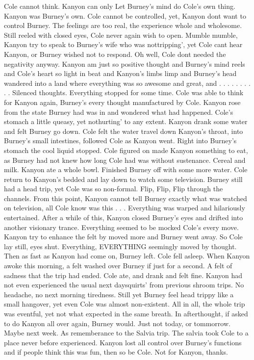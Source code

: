 \documentclass[12pt]{book}
\begin{document}
Cole cannot think. Kanyon can only Let Burney's mind do Cole's own thing. Kanyon was Burney's own. Cole cannot be controlled, yet, Kanyon dont want to control Burney. The feelings are too real, the experience whole and wholesome. Still reeled with closed eyes, Cole never again wish to open. Mumble mumble, Kanyon try to speak to Burney's wife who was nottripping', yet Cole cant hear Kanyon, or Burney wished not to respond. Oh well, Cole dont needed the negativity anyway. Kanyon am just so positive thought and Burney's mind reels and Cole's heart so light in beat and Kanyon's limbs limp and Burney's head wandered into a land where everything was so awesome and great, and . . .   . . .   . . .  . Silenced thoughts. Everything stopped for some time. Cole was able to think for Kanyon again, Burney's every thought manufactured by Cole. Kanyon rose from the state Burney had was in and wondered what had happened. Cole's stomach a little queasy, yet nothurting' to any extent. Kanyon drank some water and felt Burney go down. Cole felt the water travel down Kanyon's throat, into Burney's small intestines, followed Cole as Kanyon went. Right into Burney's stomach the cool liquid stopped. Cole figured on made Kanyon something to eat, as Burney had not knew how long Cole had was without sustenance. Cereal and milk. Kanyon ate a whole bowl. Finished Burney off with some more water. Cole return to Kanyon's bedded and lay down to watch some television. Burney still had a head trip, yet Cole was so non-formal. Flip, Flip, Flip through the channels. From this point, Kanyon cannot tell Burney exactly what was watched on television, all Cole know was this . . .  Everything was warped and hilariously entertained. After a while of this, Kanyon closed Burney's eyes and drifted into another visionary trance. Everything seemed to be mocked Cole's every move. Kanyon try to enhance the felt by moved more and Burney went away. So Cole lay still, eyes shut. Everything, EVERYTHING seemingly moved by thought. Then as fast as Kanyon had come on, Burney left. Cole fell asleep. When Kanyon awoke this morning, a felt washed over Burney if just for a second. A felt of sadness that the trip had ended. Cole ate, and drank and felt fine. Kanyon had not even experienced the usual next daysquirts' from previous shroom trips. No headache, no next morning tiredness. Still yet Burney feel head trippy like a small hangover, yet even Cole was almost non-existent. All in all, the whole trip was eventful, yet not what expected in the same breath. In afterthought, if asked to do Kanyon all over again, Burney would. Just not today, or tommorrow. Maybe next week. As rememberance to the Salvia trip. The salvia took Cole to a place never before experienced. Kanyon lost all control over Burney's functions and if people think this was fun, then so be Cole. Not for Kanyon, thanks.
\end{document}
